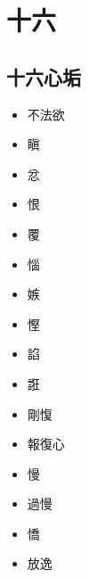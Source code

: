 \section{十六}

\subsection{十六心垢}
\begin{itemize}
  \item 不法欲  \item 瞋  \item 忿  \item 恨  \item 覆  \item 惱  \item 嫉  \item 慳  \item 諂  \item 誑  \item 剛愎  \item 報復心  \item 慢  \item 過慢  \item 憍  \item 放逸
\end{itemize}
